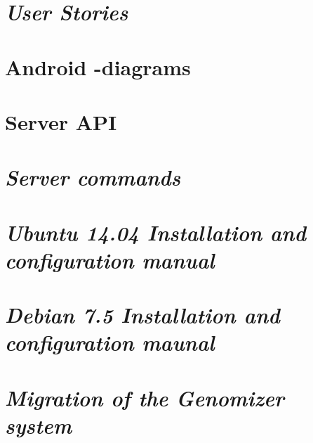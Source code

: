 \begin{appendix}

\chapter{\textit{User Stories}}

\chapter{Android -diagrams}

\chapter{Server API}

\chapter{\textit{Server commands}}

\chapter{\textit{Ubuntu 14.04 Installation and configuration manual}}

\chapter{\textit{Debian 7.5 Installation and configuration maunal}}

\chapter{\textit{Migration of the Genomizer system}}

\end{appendix}
